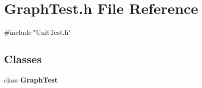 \section{Graph\+Test.\+h File Reference}
\label{GraphTest_8h}
{\ttfamily \#include \char`\"{}Unit\+Test.\+h\char`\"{}}\newline
\subsection*{Classes}
\begin{DoxyCompactItemize}
\item 
class \textbf{ Graph\+Test}
\end{DoxyCompactItemize}
